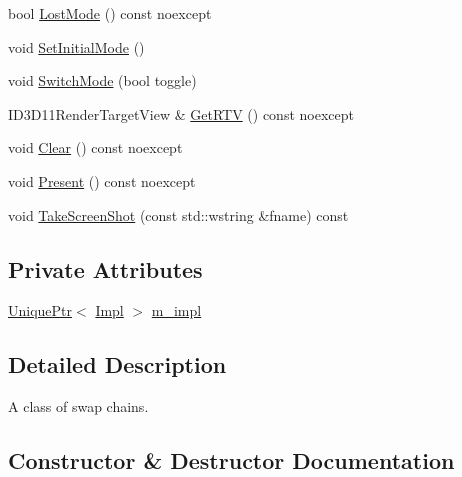 \begin{DoxyCompactItemize}
\item 
bool \mbox{\hyperlink{classmage_1_1rendering_1_1_swap_chain_a8d4356d1652fca65095bc4db2bd0c1f2}{Lost\+Mode}} () const noexcept
\item 
void \mbox{\hyperlink{classmage_1_1rendering_1_1_swap_chain_a7ceec40e9007d1d6be3bdcd003fe9985}{Set\+Initial\+Mode}} ()
\item 
void \mbox{\hyperlink{classmage_1_1rendering_1_1_swap_chain_a184b5aa11bdc69f7b6077de9ec0c47e0}{Switch\+Mode}} (bool toggle)
\item 
I\+D3\+D11\+Render\+Target\+View \& \mbox{\hyperlink{classmage_1_1rendering_1_1_swap_chain_ab7ef5f87f1870777bdb230e51ebdae96}{Get\+R\+TV}} () const noexcept
\item 
void \mbox{\hyperlink{classmage_1_1rendering_1_1_swap_chain_ab834da2afc837fe4c113f86c300af264}{Clear}} () const noexcept
\item 
void \mbox{\hyperlink{classmage_1_1rendering_1_1_swap_chain_a6739d35cf37b6d50adc70eb09cba2446}{Present}} () const noexcept
\item 
void \mbox{\hyperlink{classmage_1_1rendering_1_1_swap_chain_a28d3c7ed39176fb16980248e43bf09e9}{Take\+Screen\+Shot}} (const std\+::wstring \&fname) const
\end{DoxyCompactItemize}
\subsection*{Private Attributes}
\begin{DoxyCompactItemize}
\item 
\mbox{\hyperlink{namespacemage_a3316d7143a973e37adf1110f2e80ca31}{Unique\+Ptr}}$<$ \mbox{\hyperlink{classmage_1_1rendering_1_1_swap_chain_1_1_impl}{Impl}} $>$ \mbox{\hyperlink{classmage_1_1rendering_1_1_swap_chain_a983645d6494b7e731753def5356bb8e6}{m\+\_\+impl}}
\end{DoxyCompactItemize}


\subsection{Detailed Description}
A class of swap chains. 

\subsection{Constructor \& Destructor Documentation}
\mbox{\label{classmage_1_1rendering_1_1_swap_chain_a711f0c9750a2ff68a71bb9e333b2eba7}} 
